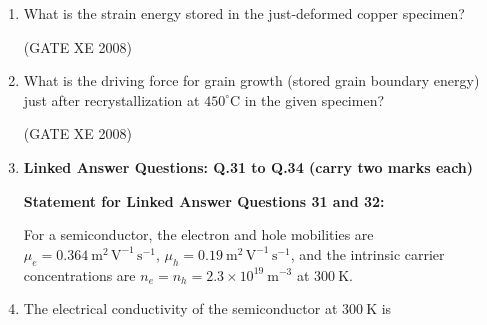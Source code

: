 \documentclass[12pt]{article}
\begin{document}
\begin{enumerate}
\item What is the strain energy stored in the just-deformed copper specimen?

\begin{enumerate}
\end{enumerate}

(GATE XE 2008)

\item What is the driving force for grain growth (stored grain boundary energy) just after recrystallization at $450^\circ \mathrm{C}$ in the given specimen?

\begin{enumerate}
\end{enumerate}

(GATE XE 2008)

\item[]\textbf{\Large Linked Answer Questions: Q.31 to Q.34 (carry two marks each)} 

\textbf{Statement for Linked Answer Questions 31 and 32:} 

    For a semiconductor, the electron and hole mobilities are $\mu_e = 0.364 \ \mathrm{m^2 \, V^{-1} \, s^{-1}}$, $\mu_h = 0.19 \ \mathrm{m^2 \, V^{-1} \, s^{-1}}$, and the intrinsic carrier concentrations are $n_e = n_h = 2.3 \times 10^{19} \ \mathrm{m^{-3}}$ at $300 \ \mathrm{K}$.

\item The electrical conductivity of the semiconductor at $300 \ \mathrm{K}$ is

\begin{enumerate}
\end{enumerate}


\end{enumerate}
\end{document}
